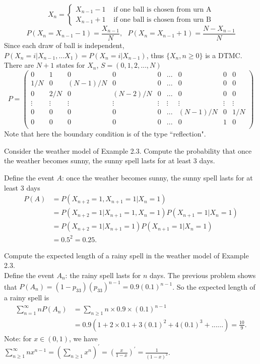 \documentclass[  11pt]{article}
\begin{document}
\begin{ExerciseList}
\Answer
\[
X_n=
\begin{cases}
X_{n-1}-1 &\mbox{ if\ one\ ball\ is\ chosen\ from\ urn\ A}\\
X_{n-1}+1& \mbox{ if\ one\ ball\ is\ chosen\ from\ urn\ B}
\end{cases}
\]
$$P(X_n=X_{n-1}-1)=\frac{X_{n-1}}{N},~~~ P(X_n=X_{n-1}+1)=\frac{N-X_{n-1}}{N}$$
Since each draw of ball is independent, $P(X_n=i|X_{n-1}, ...X_1)=P(X_n=i|X_{n-1})$, thus $\{X_n, n\geq0\}$ is a DTMC.\\

There are $N+1$ states for $X_n$, $S=(0, 1,2,...,N)$
\[
P=\left(\begin{array}{ccccccccc}
     0           & 1   & 0             & 0 & 0             & ... &0& 0 & 0\\
     1/N &  0  & (N-1)/N & 0 & 0             & ...&0 & 0 & 0\\
     0           & 2/N & 0 & (N-2)/N & 0 & ... &0& 0 & 0\\
     \vdots       & \vdots&\vdots& \vdots&\vdots &\vdots & \vdots&\vdots & \vdots\\
     0            &     0   & 0 & 0 &0& ... & (N-1)/N &0 & 1/N\\
     0            &     0   & 0 & 0 & 0&... & 0 &1 & 0\\
  \end{array}\right)
\]
Note that here the boundary condition is of the type ``reflection".

\Exercise[origin={p53,2.10}]
Consider the weather model of Example 2.3. Compute the probability that
once the weather becomes sunny, the sunny spell lasts for at least 3 days.

\Answer
Define the event $A$: once the weather becomes sunny, the sunny spell lasts for at least 3 days\\
\[
\begin{split}
P(A)&=P(X_{n+2}=1, X_{n+1}=1|X_n=1)\\
&=P(X_{n+2}=1|X_{n+1}=1, X_n=1)P(X_{n+1}=1|X_n=1)\\
&=P(X_{n+2}=1|X_{n+1}=1)P(X_{n+1}=1|X_n=1)\\
&=0.5^2=0.25.
\end{split}
\]
 



\Exercise[origin={p53, 2.11}]
Compute the expected length of a rainy spell in the weather model of Example
2.3.\\
\Answer
Define the event $A_n$: the rainy spell lasts for $n$ days. The previous problem shows that 
$P(A_n)  =(1-p_{33})(p_{33})^{n-1}=0.9(0.1)^{n-1}$. So the expected length of a rainy spell is 
\[\begin{split}
\sum_{n=1}^\infty nP(A_n) & = \sum_{n\ge 1} n \times 0.9 \times (0.1)^{n-1}\\
& =0.9(1+2\times0.1+3(0.1)^2+4(0.1)^3+......)=\frac{10}{9}.
\end{split}\]
Note: for $x\in (0,1)$, we have $\sum_{n\ge 1}^{\infty} n x^{n-1} = (\sum_{n\ge 1} x^n)^{'} = (\frac{x}{1-x})^{'} = \frac{1}{(1-x)^2}$. 
 




\end{ExerciseList}
\end{document}
